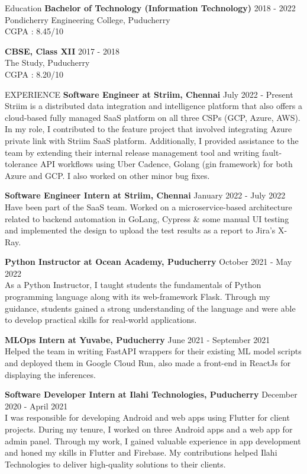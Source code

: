 \documentclass{template}
\begin{document}
\begin{rSection}{Education}
{\bf Bachelor of Technology (Information Technology)} \hfill {2018 - 2022}
\\ 
Pondicherry Engineering College, Puducherry \\
CGPA : 8.45/10

{\textbf{CBSE, Class XII}} \hfill 2017 - 2018\\
The Study, Puducherry \\
CGPA : 8.20/10

\end{rSection}

\begin{rSection}{EXPERIENCE}
\textbf{Software Engineer at Striim, Chennai} \hfill July 2022 - Present \\
Striim is a distributed data integration and intelligence platform that also offers a cloud-based fully managed SaaS platform on all three CSPs (GCP, Azure, AWS). In my role, I  contributed to the feature project that involved integrating Azure private link with Striim SaaS platform. Additionally, I provided assistance to the team by extending their internal release management tool and writing fault-tolerance API workflows using Uber Cadence, Golang (gin framework) for both Azure and GCP. I also worked on other minor bug fixes.

\textbf{Software Engineer Intern at Striim, Chennai} \hfill January 2022 - July 2022 \\
Have been part of the SaaS team. Worked on a microservice-based architecture related to backend automation in GoLang, Cypress \& some manual UI testing and implemented the design to upload the test results as a report to Jira's X-Ray.

\textbf{Python Instructor at Ocean Academy, Puducherry} \hfill October 2021 - May 2022 \\
As a Python Instructor, I taught students the fundamentals of Python programming language along with its web-framework Flask. Through my guidance, students gained a strong understanding of the language and were able to develop practical skills for real-world applications.

\textbf{MLOps Intern at Yuvabe, Puducherry} \hfill June 2021 - September 2021 \\
Helped the team in writing FastAPI wrappers for their existing ML model scripts and deployed them in Google Cloud Run, also made a front-end in ReactJs for displaying the inferences.

\textbf{Software Developer Intern at Ilahi Technologies, Puducherry} \hfill December 2020 - April 2021 \\
I was responsible for developing Android and web apps using Flutter for client projects. During my tenure, I worked on three Android apps and a web app for admin panel. Through my work, I gained valuable experience in app development and honed my skills in Flutter and Firebase. My contributions helped Ilahi Technologies to deliver high-quality solutions to their clients.

\end{rSection} 
\end{document}
